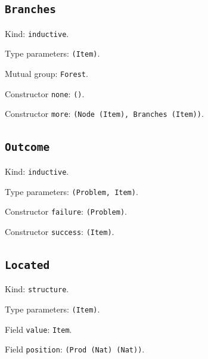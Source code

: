 \documentclass[11pt]{article}
\begin{document}
\subsection*{\texttt{Branches}}
\noindent Kind: \texttt{inductive}.\par
\noindent Type parameters: \texttt{(Item)}.\par
\noindent Mutual group: \texttt{Forest}.\par
\noindent Constructor \texttt{none}: \texttt{()}.\par
\noindent Constructor \texttt{more}: \texttt{(Node (Item), Branches (Item))}.\par
\subsection*{\texttt{Outcome}}
\noindent Kind: \texttt{inductive}.\par
\noindent Type parameters: \texttt{(Problem, Item)}.\par
\noindent Constructor \texttt{failure}: \texttt{(Problem)}.\par
\noindent Constructor \texttt{success}: \texttt{(Item)}.\par
\subsection*{\texttt{Located}}
\noindent Kind: \texttt{structure}.\par
\noindent Type parameters: \texttt{(Item)}.\par
\noindent Field \texttt{value}: \texttt{Item}.\par
\noindent Field \texttt{position}: \texttt{(Prod (Nat) (Nat))}.\par
\end{document}

